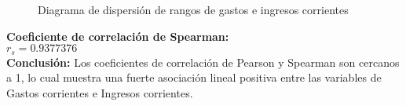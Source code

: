 \documentclass[12pt,letterpaper,fleqn]{article}
\begin{document}
\begin{enumerate}[label=\textbf{\arabic*.}]
            \begin{figure}[!htb]
                \centering
                
                \caption{Diagrama de dispersión de rangos de gastos e ingresos corrientes}
                \label{fig:figure7}
            \end{figure}

            \textbf{Coeficiente de correlación de Spearman:} \\
            $ r_s = 0.9377376 $ \\


            \textbf{Conclusión:}
            Los coeficientes de correlación de Pearson y Spearman son cercanos a 1, lo cual muestra una fuerte asociación lineal positiva entre las variables de Gastos corrientes e Ingresos corrientes.


    \end{enumerate}
\end{document}
